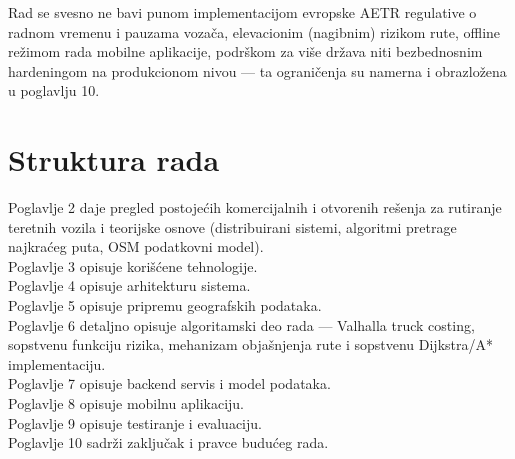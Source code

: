 Rad se svesno ne bavi punom implementacijom evropske AETR regulative o radnom vremenu i pauzama vozača, elevacionim (nagibnim) rizikom rute, offline režimom rada mobilne aplikacije, podrškom za više država niti bezbednosnim hardeningom na produkcionom nivou — ta ograničenja su namerna i obrazložena u poglavlju 10.

\section{Struktura rada}

Poglavlje 2 daje pregled postojećih komercijalnih i otvorenih rešenja za rutiranje teretnih vozila i teorijske osnove (distribuirani sistemi, algoritmi pretrage najkraćeg puta, OSM podatkovni model).\\Poglavlje 3 opisuje korišćene tehnologije.\\Poglavlje 4 opisuje arhitekturu sistema. \\Poglavlje 5 opisuje pripremu geografskih podataka.\\Poglavlje 6 detaljno opisuje algoritamski deo rada — Valhalla truck costing, sopstvenu funkciju rizika, mehanizam objašnjenja rute i sopstvenu Dijkstra/A* implementaciju. \\Poglavlje 7 opisuje backend servis i model podataka. \\Poglavlje 8 opisuje mobilnu aplikaciju. \\Poglavlje 9 opisuje testiranje i evaluaciju. \\Poglavlje 10 sadrži zaključak i pravce budućeg rada.

\clearpage
